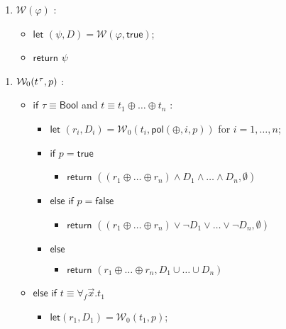 \documentclass[runningheads,a4paper]{llncs}
\newcommand{\con}[1]{\mathsf{#1}}
\newcommand{\conv}{\mathcal{W}}
\newcommand{\ptrue}{\con{true}}
\newcommand{\pfalse}{\con{false}}
\newcommand{\pol}{\con{pol}}
\newcommand{\Bool}{\con{Bool}}
\newcommand{\boolop}{\oplus}
\newcommand{\forallf}[1]{\forall_{#1}}
\newcommand{\vthinspace}{\kern+0.083333em}
\newcommand{\typ}[1]{^{\vthinspace #1}}
\begin{document}
\begin{figure}[t]
\begin{enumerate}
\item[\ ] 
$\conv( \varphi )$ : 
 \begin{itemize}
   \item[] $\mathsf{let}$ $( \psi, D ) = \conv( \varphi, \ptrue )$;
   \item[] $\mathsf{return}$ $\psi$
  \end{itemize}
\end{enumerate}
\begin{enumerate}
\item[\ ] 
$\conv_0( t\typ{\tau}, p )$ : 
 \begin{itemize}
   \item[] $\mathsf{if}$ $\tau \equiv \Bool$ and $t \equiv t_1 \boolop \ldots \boolop t_n$ :
    \begin{itemize}
      \item[] $\mathsf{let}$ $( r_i, D_i ) = \conv_0( t_i, \pol( \boolop, i, p ) )$ for $i = 1, \ldots, n$;
      \item[] $\mathsf{if}$ $p = \ptrue$
      \begin{itemize}
        \item[] $\mathsf{return}$ $( ( r_1 \boolop \ldots \boolop r_n ) \wedge D_1 \wedge \ldots \wedge D_n, \emptyset )$
      \end{itemize}
      \item[] $\mathsf{else}$ $\mathsf{if}$ $p = \pfalse$
      \begin{itemize}
        \item[] $\mathsf{return}$ $( ( r_1 \boolop \ldots \boolop r_n ) \vee \neg D_1 \vee \ldots \vee \neg D_n, \emptyset )$
      \end{itemize}
      \item[] $\mathsf{else}$
      \begin{itemize}
        \item[] $\mathsf{return}$ $( r_1 \boolop \ldots \boolop r_n, D_1 \cup \ldots \cup D_n )$
      \end{itemize}
    \end{itemize}
  \item[] $\mathsf{else}$ $\mathsf{if}$ $t \equiv \forallf{f} \vec x. t_1$
    \begin{itemize}
      \item[] $\mathsf{let} ( r_1, D_1 ) = \conv_0( t_1, p )$;

\end{itemize}
\end{itemize}
\end{enumerate}
\end{figure}
\end{document}
